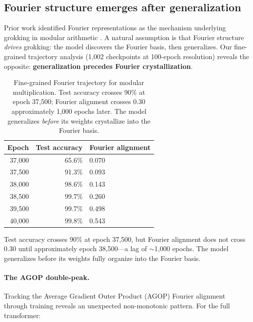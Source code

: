 \subsection{Fourier structure emerges after generalization}
\label{app:fourier_trajectory}

Prior work identified Fourier representations as the mechanism underlying
grokking in modular arithmetic \citep{nanda2023progress, zhong2024clock}.
A natural assumption is that Fourier structure \emph{drives} grokking:
the model discovers the Fourier basis, then generalizes. Our fine-grained
trajectory analysis (1{,}002 checkpoints at 100-epoch resolution) reveals
the opposite: \textbf{generalization precedes Fourier crystallization}.

\begin{table}[t]
\centering
\small
\begin{tabular}{rrl}
\toprule
Epoch & Test accuracy & Fourier alignment \\
\midrule
37{,}000 & 65.6\% & 0.070 \\
37{,}500 & 91.3\% & 0.093 \\
38{,}000 & 98.6\% & 0.143 \\
38{,}500 & 99.7\% & 0.260 \\
39{,}500 & 99.7\% & 0.498 \\
40{,}000 & 99.8\% & 0.543 \\
\bottomrule
\end{tabular}
\caption{Fine-grained Fourier trajectory for modular multiplication.
Test accuracy crosses 90\% at epoch 37{,}500; Fourier alignment crosses 0.30
approximately 1{,}000 epochs later. The model generalizes \emph{before} its
weights crystallize into the Fourier basis.}
\label{tab:fourier_lag}
\end{table}

Test accuracy crosses 90\% at epoch 37{,}500, but Fourier alignment does not
cross 0.30 until approximately epoch 38{,}500---a lag of $\sim$1{,}000
epochs. The model generalizes before its weights fully organize into the
Fourier basis.

\paragraph{The AGOP double-peak.}
Tracking the Average Gradient Outer Product (AGOP) Fourier alignment through
training reveals an unexpected non-monotonic pattern. For the full transformer:

